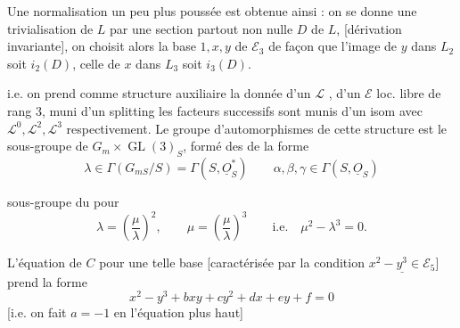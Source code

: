 
Une normalisation un peu plus poussée est obtenue ainsi : on se donne une trivialisation de $L$ par une section partout non nulle $D$ de $L$, [dérivation invariante], on choisit alors la base $1,x,y$ de $\mathcal E_3$ de façon que l'image de $y$ dans $L_2$ soit $i_2(D)$, celle de $x$ dans $L_3$ soit $i_3(D)$. 

\deleted{[} i.e. on prend comme structure auxiliaire la donnée d'un $\mathcal L$ , d'un $\mathcal E$ loc. libre de rang $3$, muni d'un splitting  les facteurs successifs sont munis d'un isom avec $\mathcal L^0,\mathcal L^2,\mathcal L^3$ respectivement.
Le groupe d'automorphismes de cette structure est  le sous-groupe de $G_m\times\operatorname{GL}(3)_S$, formé des  de la forme
\[
\lambda\in\Gamma(G_{mS}/S)=\Gamma(S,\underline O_S^*)\qquad
\alpha,\beta,\gamma\in\Gamma(S,\underline O_S)
\]

    sous-groupe du 
pour
\[
\lambda=\left(\frac\mu\lambda\right)^2,\qquad
\mu=\left(\frac\mu\lambda\right)^3\qquad\text{i.e.}\quad\boxed{\mu^2-\lambda^3=0}.
\]

L'équation de $C$ pour une telle base  [caractérisée par la condition $\underline{x^2-y^3\in \mathcal E_5}$] prend la forme
\[
x^2-y^3+bxy+cy^2+dx+ey+f=0
\]
[i.e. on fait $a=-1$ en l'équation plus haut] 
